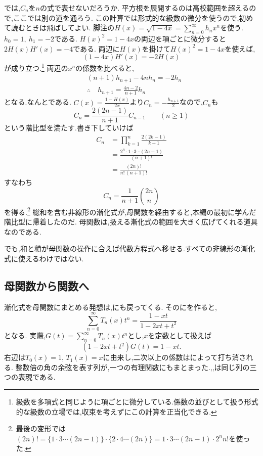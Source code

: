 では,$C_n$を$n$の式で表せないだろうか.
平方根を展開するのは高校範囲を超えるので,ここでは別の道を通ろう.
この計算では形式的な級数の微分を使うので,初めて読むときは飛ばしてよい.
脚注の$H(x)=\sqrt{1-4x}=\sum_{n=0}^{\infty}h_nx^n$を使う.$h_0=1,\ h_1=-2$である.
$H(x)^2=1-4x$の両辺を項ごとに微分すると$2H(x)H'(x)=-4$である.
両辺に$H(x)$を掛けて$H(x)^2=1-4x$を使えば,
\[
  (1-4x)H'(x)=-2H(x)
\]
が成り立つ.\footnote{級数を多項式と同じように項ごとに微分している.係数の並びとして扱う形式的な級数の立場では,収束を考えずにこの計算を正当化できる.}
両辺の$x^n$の係数を比べると,
\begin{align*}
  &(n+1)h_{n+1}-4nh_n=-2h_n\\
  &\therefore\quad h_{n+1}=\frac{4n-2}{n+1}h_n
\end{align*}
となる.なんとである.
$C(x)=\frac{1-H(x)}{2x}$より$C_n=-\frac{h_{n+1}}{2}$なので,$C_n$も
\[
  C_n=\frac{2(2n-1)}{n+1}C_{n-1}\qquad(n\ge1)
\]
という階比型を満たす.書き下していけば
\begin{align*}
  C_n&=\prod_{k=1}^{n}\frac{2(2k-1)}{k+1}\\
  &=\frac{2^n\cdot1\cdot3\cdots(2n-1)}{(n+1)!}\\
  &=\frac{(2n)!}{n!\,(n+1)!}
\end{align*}
すなわち
\[
  C_n=\frac{1}{n+1}\binom{2n}{n}
\]
を得る.\footnote{最後の変形では$(2n)!=\{1\cdot3\cdots(2n-1)\}\cdot\{2\cdot4\cdots(2n)\}=1\cdot3\cdots(2n-1)\cdot2^nn!$を使った.}
総和を含む非線形の漸化式が,母関数を経由すると,本編の最初に学んだ階比型に帰着したのだ.
母関数は,扱える漸化式の範囲を大きく広げてくれる道具なのである.

でも,和と積が母関数の操作に合えば代数方程式へ移せる.すべての非線形の漸化式に使えるわけではない.

\subsection{母関数から関数へ}
漸化式を母関数にまとめる発想は,にも戻ってくる.
そのにを作ると,
\[
  \sum_{n=0}^{\infty}T_n(x)t^n
  =\frac{1-xt}{1-2xt+t^2}
\]
となる.
実際,$G(t)=\sum_{n=0}^\infty T_n(x)t^n$とし,$x$を定数として扱えば
\[
  (1-2xt+t^2)G(t)=1-xt.
\]
右辺は$T_0(x)=1$, $T_1(x)=x$に由来し,二次以上の係数はによって打ち消される.
整数倍の角の余弦を表す列が,一つの有理関数にもまとまった.,,は同じ列の三つの表現である.

